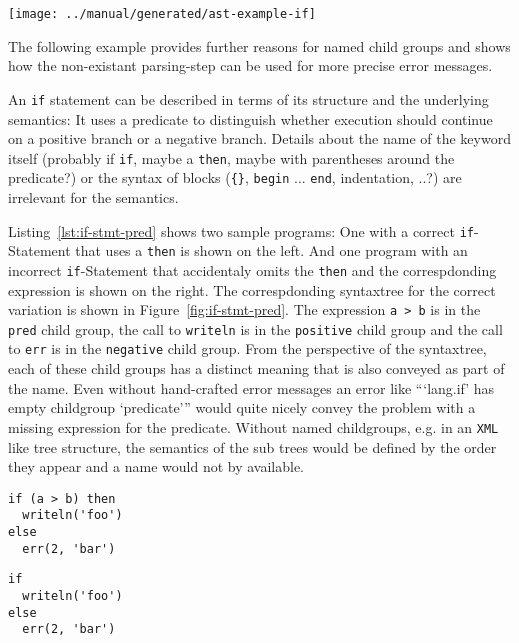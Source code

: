 \documentclass[sigconf,natbib=false,review=true,anonymous]{acmart}
\newcommand\astScale{0.7}
\begin{document}
\begin{figure*}
  \texttt{[image: ../manual/generated/ast-example-if]}
  \caption{\texttt{if}-Statement with predicate}
  \label{fig:if-stmt-pred}
\end{figure*}

The following example provides further reasons for named child groups and shows how the non-existant parsing-step can be used for more precise error messages.

An \texttt{if} statement can be described in terms of its structure and the underlying semantics: It uses a predicate to distinguish whether execution should continue on a positive branch or a negative branch. Details about the name of the keyword itself (probably if \texttt{if}, maybe a \texttt{then}, maybe with parentheses around the predicate?) or the syntax of blocks (\texttt{\{\}}, \texttt{begin} ... \texttt{end}, indentation, ..?) are irrelevant for the semantics.


Listing~\ref{lst:if-stmt-pred} shows two sample programs: One with a correct \texttt{if}-Statement that uses a \texttt{then} is shown on the left. And one program with an incorrect \texttt{if}-Statement that accidentaly omits the \texttt{then} and the correspdonding expression is shown on the right. The correspdonding syntaxtree for the correct variation is shown in Figure~\ref{fig:if-stmt-pred}. The expression \texttt{a > b} is in the \texttt{pred} child group, the call to \texttt{writeln} is in the \texttt{positive} child group and the call to \texttt{err} is in the \texttt{negative} child group. From the perspective of the syntaxtree, each of these child groups has a distinct meaning that is also conveyed as part of the name. Even without hand-crafted error messages an error like \enquote{\enquote{lang.if} has empty childgroup \enquote{predicate}} would quite nicely convey the problem with a missing expression for the predicate. Without named childgroups, e.g. in an \texttt{XML} like tree structure, the semantics of the sub trees would be defined by the order they appear and a name would not by available.

\begin{listing}[H]
\begin{minipage}{.20\textwidth}
\begin{verbatim}
if (a > b) then
  writeln('foo')
else
  err(2, 'bar')
\end{verbatim}
\end{minipage}
\begin{minipage}{.20\textwidth}
\begin{verbatim}
if
  writeln('foo')
else
  err(2, 'bar')
\end{verbatim}
\end{minipage}
\caption{\texttt{if}-Statement with and without predicate}
\label{lst:if-stmt-pred}
\end{listing}
\end{document}
